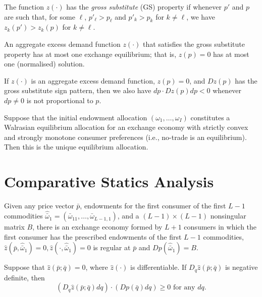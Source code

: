 \begin{defn}
    The function $z(\cdot)$ has the \emph{gross substitute} (GS) property if whenever $p'$ and $p$ are such that, for some $\ell$, $p'_\ell > p_\ell$ and $p'_k > p_k$ for $k \neq \ell$, we have $z_k(p') > z_k(p)$ for $k \neq \ell$.
\end{defn}

\begin{prop}
    An aggregate excess demand function $z(\cdot)$ that satisfies the gross substitute property has at most one exchange equilibrium; that is, $z(p) = 0$ has at most one (normalised) solution.
\end{prop}

\begin{prop}
    If $z(\cdot)$ is an aggregate excess demand function, $z(p) = 0$, and $Dz(p)$ has the gross substitute sign pattern, then we also have $dp \cdot Dz(p) dp < 0$ whenever $dp \neq 0$ is not proportional to $p$.
\end{prop}

\begin{prop}
    Suppose that the initial endowment allocation $(\omega_1, \dots, \omega_I)$ constitutes a Walrasian equilibrium allocation for an exchange economy with strictly convex and strongly monotone consumer preferences (i.e., no-trade is an equilibrium). Then this is the unique equilibrium allocation.
\end{prop}


\section{Comparative Statics Analysis}

\begin{prop}
    Given any price vector $\bar{p}$, endowments for the first consumer of the first $L - 1$ commodities $\hat{\bar{\omega}}_1 = (\bar{\omega}_{11}, \dots, \bar{\omega}_{L - 1, 1})$, and a $(L - 1) \times (L - 1)$ nonsingular matrix $B$, there is an exchange economy formed by $L + 1$ consumers in which the first consumer has the prescribed endowments of the first $L - 1$ commodities, $\hat{z}(\bar{p}, \hat{\bar{\omega}}_1) = 0, \hat{z}(\cdot, \hat{\bar{\omega}}_1) = 0$ is regular at $\bar{p}$ and $D p(\hat{\bar{\omega}}_1) = B$.
\end{prop}

\begin{prop}
    Suppose that $\hat{z} (\bar{p}; \bar{q}) = 0$, where $\hat{z}(\cdot)$ is differentiable. If $D_q \hat{z} (\bar{p}; \bar{q})$ is negative definite, then
    \begin{equation*}
        \left( D_q \hat{z} (\bar{p}; \bar{q}) dq \right) \cdot \left( D p(\bar{q}) dq \right) \geq 0 \text{ for any } dq.
    \end{equation*}
\end{prop}

